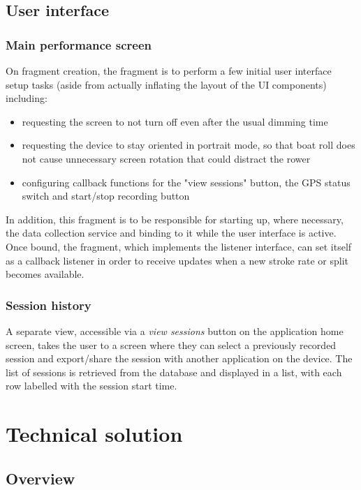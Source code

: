 \documentclass[11pt,twoside,a4paper]{report}
\begin{document}
\section{User interface}

\subsection{Main performance screen}\label{sec:pmfrag}

On fragment creation, the fragment is to perform a few initial user interface setup tasks (aside from actually inflating the layout of the UI components) including:
\begin{itemize}
  \item requesting the screen to not turn off even after the usual dimming time
  \item requesting the device to stay oriented in portrait mode, so that boat roll does not cause unnecessary screen rotation that could distract the rower
  \item configuring callback functions for the "view sessions" button, the GPS status switch and start/stop recording button
\end{itemize}

In addition, this fragment is to be responsible for starting up, where necessary, the data collection service and binding to it while the user interface is active. Once bound, the fragment, which implements the listener interface, can set itself as a callback listener in order to receive updates when a new stroke rate or split becomes available.

\subsection{Session history}

A separate view, accessible via a \textit{view sessions} button on the application home screen, takes the user to a screen where they can select a previously recorded session and export/share the session with another application on the device. The list of sessions is retrieved from the database and displayed in a list, with each row labelled with the session start time.

\chapter{Technical solution}

\section{Overview}
\end{document}
